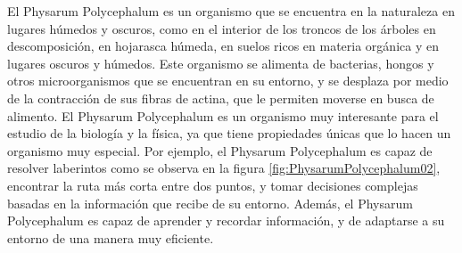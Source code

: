     \vskip 0.5cm
    El Physarum Polycephalum es un organismo que se encuentra en la naturaleza en lugares h\'umedos y oscuros, 
        como en el interior de los troncos de los \'arboles en descomposici\'on, en hojarasca h\'umeda, en suelos 
        ricos en materia org\'anica y en lugares oscuros y h\'umedos. Este organismo se alimenta de bacterias, 
        hongos y otros microorganismos que se encuentran en su entorno, y se desplaza por medio de la contracci\'on 
        de sus fibras de actina, que le permiten moverse en busca de alimento.\cite{Dee1960}
    \vskip 0.5cm
    El Physarum Polycephalum es un organismo muy interesante para el estudio de la biolog\'ia y la f\'isica, 
        ya que tiene propiedades \'unicas que lo hacen un organismo muy especial. Por ejemplo, el Physarum Polycephalum 
        es capaz de resolver laberintos como se observa en la figura \ref{fig:PhysarumPolycephalum02}, encontrar la ruta m\'as corta entre dos puntos, y tomar decisiones complejas 
        basadas en la informaci\'on que recibe de su entorno. Adem\'as, el Physarum Polycephalum es capaz de aprender 
        y recordar informaci\'on, y de adaptarse a su entorno de una manera muy eficiente.
    
